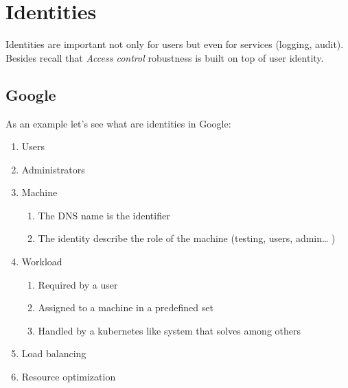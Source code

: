 \section{Identities}
Identities are important not only for users but even for services (logging, audit).
Besides recall that \textit{Access control} robustness is built on top of user identity.

\subsection{Google}
As an example let's see what are identities in Google:
\begin{enumerate}
   \item Users
   \item Administrators
   \item Machine
   \begin{enumerate}
      \item The DNS name is the identifier
      \item The identity describe the role of the machine (testing, users, admin… )
   \end{enumerate}
   \item Workload
   \begin{enumerate}
      \item Required by a user
      \item Assigned to a machine in a predefined set
      \item Handled by a kubernetes like system that solves among others
   \end{enumerate}
      \item Load balancing
   \item Resource optimization
\end{enumerate}

